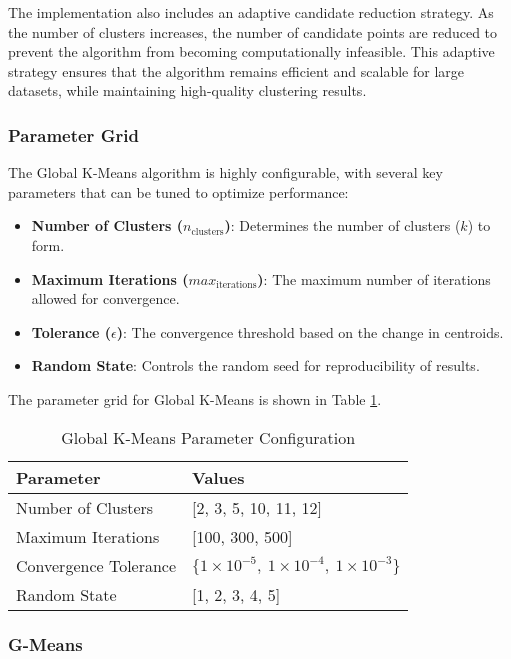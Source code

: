 The implementation also includes an adaptive candidate reduction strategy. As the number of clusters increases, the number of candidate
points are reduced to prevent the algorithm from becoming computationally infeasible. This adaptive strategy ensures that the algorithm
remains efficient and scalable for large datasets, while maintaining high-quality clustering results.

\subsubsection*{Parameter Grid}

The Global K-Means algorithm is highly configurable, with several key parameters that can be tuned to optimize performance:

\begin{itemize}
    \item \textbf{Number of Clusters (\(n_{\text{clusters}}\))}: Determines the number of clusters (\(k\)) to form.
    \item \textbf{Maximum Iterations (\(max_{\text{iterations}}\))}: The maximum number of iterations allowed for convergence.
    \item \textbf{Tolerance (\(\epsilon\))}: The convergence threshold based on the change in centroids.
    \item \textbf{Random State}: Controls the random seed for reproducibility of results.
\end{itemize}

The parameter grid for Global K-Means is shown in Table \ref{tab:globalkmeansparams}.

\begin{table}[h!]
\centering
\caption{Global K-Means Parameter Configuration}
\label{tab:globalkmeansparams}
\begin{tabularx}{\columnwidth}{|X|X|}
\hline
\textbf{Parameter} & \textbf{Values}\\ \hline
Number of Clusters & [2, 3, 5, 10, 11, 12] \\ \hline
Maximum Iterations & [100, 300, 500] \\ \hline
Convergence Tolerance & $\{1 \times 10^{-5},\ 1 \times 10^{-4},\ 1 \times 10^{-3}\}$ \\ \hline
Random State & [1, 2, 3, 4, 5] \\ \hline
\end{tabularx}
\end{table}


\subsubsection{G-Means}
\label{subsec:gmeansdiscussion}


